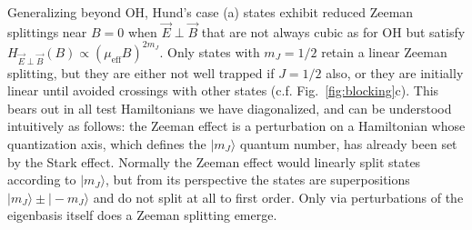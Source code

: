 \documentclass[%
 reprint,
 amsmath,amssymb,
 aps,
prl,
]{revtex4-1}
\newcommand{\epb}{{$\vec{E}\!\perp\!\vec{B}$}}
\newcommand{\epbm}{{\vec{E}\!\perp\!\vec{B}}}
\begin{document}


Generalizing beyond OH, Hund's case (a) states exhibit reduced Zeeman splittings near $B\!=\!0$ when \epb{} that are not always cubic as for OH but satisfy $H_\epbm(B)\propto (\mu_\text{eff}B)^{2m_J}$. 
Only states with $m_J=1/2$ retain a linear Zeeman splitting, but they are either not well trapped if $J=1/2$ also, or they are initially linear until avoided crossings with other states (c.f. Fig.~\ref{fig:blocking}c). 
This bears out in all test Hamiltonians we have diagonalized, and can be understood intuitively as follows: the Zeeman effect is a perturbation on a Hamiltonian whose quantization axis, which defines the $|m_J\rangle$ quantum number, has already been set by the Stark effect. 
Normally the Zeeman effect would linearly split states according to $|m_J\rangle$, but from its perspective the states are superpositions $|m_J\rangle\pm|\!-\!m_J\rangle$ and do not split at all to first order. 
Only via perturbations of the eigenbasis itself does a Zeeman splitting emerge.



%
\end{document}
